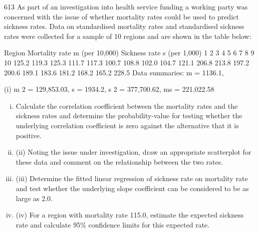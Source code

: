 \documentclass[a4paper,12pt]{article}
\begin{document}
\begin{enumerate}
613
As part of an investigation into health service funding a working party was concerned with the issue of whether mortality rates could be used to predict sickness rates. Data on standardised mortality rates and standardised sickness rates were collected for a sample of 10 regions and are shown in the table below:

Region Mortality rate m (per 10,000) Sickness rate s (per 1,000)
1
2
3
4
5
6
7
8
9
10 125.2
119.3
125.3
111.7
117.3
100.7
108.8
102.0
104.7
121.1 206.8
213.8
197.2
200.6
189.1
183.6
181.2
168.2
165.2
228.5
Data summaries:
m = 1136.1,

(i)
m 2 = 129,853.03, s = 1934.2,
s 2 = 377,700.62, ms = 221,022.58

\begin{enumerate}[(i)]
\item Calculate the correlation coefficient between the mortality rates and the sickness rates and determine the probability-value for testing whether the underlying correlation coefficient is zero against the alternative that it is positive.

\item (ii) Noting the issue under investigation, draw an appropriate scatterplot for these data and comment on the relationship between the two rates.

\item (iii) Determine the fitted linear regression of sickness rate on mortality rate and test whether the underlying slope coefficient can be considered to be as large as 2.0.

\item (iv) For a region with mortality rate 115.0, estimate the expected sickness rate and calculate 95\% confidence limits for this expected rate.
\end{enumerate}


\end{enumerate}
\end{document}
